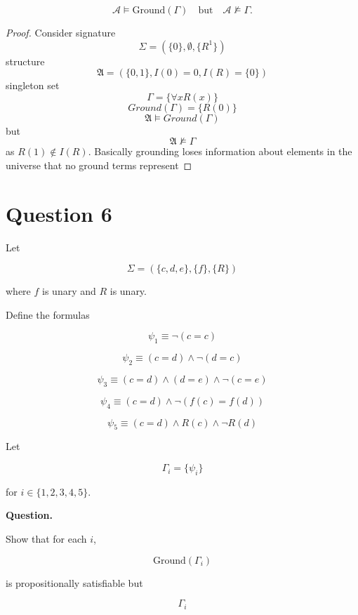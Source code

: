 \documentclass{article}
\begin{document}
\[
\mathcal{A}\models \mathrm{Ground}(\Gamma)
\quad \text{but} \quad
\mathcal{A}\not\models \Gamma.
\]

\begin{proof}
    Consider signature
    \[\Sigma = (\{0\}, \emptyset, \{R^1\})\]
    structure 
    \[\mathfrak{A} = (\{0,1\}, I(0) = 0, I(R)=\{0\})\]
    singleton set
    \[\Gamma = \{\forall x R(x)\}\]
    \[Ground(\Gamma) = \{R(0)\}\]
    \[\mathfrak{A} \models Ground(\Gamma)\]
    but    
    \[\mathfrak{A} \not\models \Gamma\]
    as $R(1) \notin I(R)$. Basically grounding loses information about elements in the universe that no ground terms represent
\end{proof}

\bigskip

\section*{Question 6}

Let

\[
\Sigma = (\{c,d,e\}, \{f\}, \{R\})
\]

where $f$ is unary and $R$ is unary.

Define the formulas

\[
\psi_1 \equiv \neg(c=c)
\]

\[
\psi_2 \equiv (c=d) \wedge \neg(d=c)
\]

\[
\psi_3 \equiv (c=d) \wedge (d=e) \wedge \neg(c=e)
\]

\[
\psi_4 \equiv (c=d) \wedge \neg(f(c)=f(d))
\]

\[
\psi_5 \equiv (c=d) \wedge R(c) \wedge \neg R(d)
\]

Let

\[
\Gamma_i = \{\psi_i\}
\]

for $i\in\{1,2,3,4,5\}$.

\textbf{Question.}

Show that for each $i$,

\[
\mathrm{Ground}(\Gamma_i)
\]

is propositionally satisfiable but

\[
\Gamma_i
\]
\end{document}
